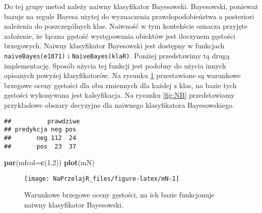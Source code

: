 \documentclass[polish,]{book}
\newenvironment{Shaded}{\begin{snugshade}}{\end{snugshade}}
\newcommand{\CommentTok}[1]{\textcolor[rgb]{0.56,0.35,0.01}{\textit{#1}}}
\newcommand{\DataTypeTok}[1]{\textcolor[rgb]{0.13,0.29,0.53}{#1}}
\newcommand{\DecValTok}[1]{\textcolor[rgb]{0.00,0.00,0.81}{#1}}
\newcommand{\KeywordTok}[1]{\textcolor[rgb]{0.13,0.29,0.53}{\textbf{#1}}}
\newcommand{\NormalTok}[1]{#1}
\newcommand{\OperatorTok}[1]{\textcolor[rgb]{0.81,0.36,0.00}{\textbf{#1}}}
\newcommand{\StringTok}[1]{\textcolor[rgb]{0.31,0.60,0.02}{#1}}
\begin{document}
Do tej grupy metod należy naiwny klasyfikator Bayesowski. Bayesowski, ponieważ bazuje na regule Bayesa użytej do wyznaczenia prawdopodobieństwa a posteriori
należenia do poszczególnych klas. Naiwność w tym kontekście oznacza przyjęte założenie, że łączna gęstość występowania obiektów jest iloczynem gęstości brzegowych.
Naiwny klasyfikator Bayesowski jest dostępny w funkcjach \texttt{naiveBayes(e1071)} i \texttt{NaiveBayes(klaR)}.
Poniżej przedstawimy tą drugą implementację.
Sposób użycia tej funkcji jest podobny do użycia innych opisanych powyżej klasyfikatorów. Na rysunku \ref{fig:mN} przestawione są warunkowe brzegowe oceny gęstości dla
obu zmiennych dla każdej z klas, na bazie tych gęstości wykonywana jest kalsyfikacja. Na rysunku \ref{fig:NB} przedstawiamy przykładowe obszary decyzyjne dla naiwnego klasyfikatora Bayesowskiego.

\begin{Shaded}
\end{Shaded}

\begin{verbatim}
##          prawdziwe
## predykcja neg pos
##       neg 112  24
##       pos  23  37
\end{verbatim}

\begin{Shaded}
\begin{Highlighting}[]
\KeywordTok{par}\NormalTok{(}\DataTypeTok{mfcol=}\KeywordTok{c}\NormalTok{(}\DecValTok{1}\NormalTok{,}\DecValTok{2}\NormalTok{))}
\KeywordTok{plot}\NormalTok{(mN)}
\end{Highlighting}
\end{Shaded}

\begin{figure}[h]

{\centering \texttt{[image: NaPrzelajR\_files/figure-latex/mN-1]} 

}

\caption{Warunkowe brzegowe oceny gęstości, na ich bazie funkcjonuje naiwny klasyfikator Bayesowski.}\label{fig:mN}
\end{figure}
\end{document}
